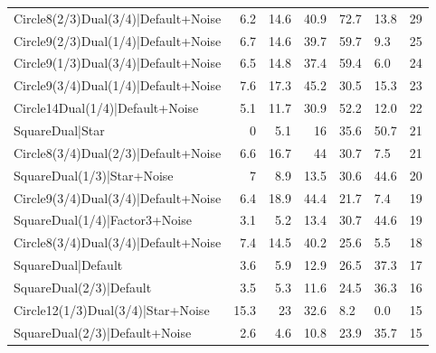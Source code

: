 \begin{tabular}{lrrrllr}
 Circle8(2/3)Dual(3/4)|Default+Noise  &             6.2 &           14.6 &            40.9 & 72.7            & 13.8            &           29 \\
 Circle9(2/3)Dual(1/4)|Default+Noise  &             6.7 &           14.6 &            39.7 & 59.7            & 9.3             &           25 \\
 Circle9(1/3)Dual(3/4)|Default+Noise  &             6.5 &           14.8 &            37.4 & 59.4            & 6.0             &           24 \\
 Circle9(3/4)Dual(1/4)|Default+Noise  &             7.6 &           17.3 &            45.2 & 30.5            & 15.3            &           23 \\
 Circle14Dual(1/4)|Default+Noise      &             5.1 &           11.7 &            30.9 & 52.2            & 12.0            &           22 \\
 SquareDual|Star                      &             0   &            5.1 &            16   & 35.6            & 50.7            &           21 \\
 Circle8(3/4)Dual(2/3)|Default+Noise  &             6.6 &           16.7 &            44   & 30.7            & 7.5             &           21 \\
 SquareDual(1/3)|Star+Noise           &             7   &            8.9 &            13.5 & 30.6            & 44.6            &           20 \\
 Circle9(3/4)Dual(3/4)|Default+Noise  &             6.4 &           18.9 &            44.4 & 21.7            & 7.4             &           19 \\
 SquareDual(1/4)|Factor3+Noise        &             3.1 &            5.2 &            13.4 & 30.7            & 44.6            &           19 \\
 Circle8(3/4)Dual(3/4)|Default+Noise  &             7.4 &           14.5 &            40.2 & 25.6            & 5.5             &           18 \\
 SquareDual|Default                   &             3.6 &            5.9 &            12.9 & 26.5            & 37.3            &           17 \\
 SquareDual(2/3)|Default              &             3.5 &            5.3 &            11.6 & 24.5            & 36.3            &           16 \\
 Circle12(1/3)Dual(3/4)|Star+Noise    &            15.3 &           23   &            32.6 & 8.2             & 0.0             &           15 \\
 SquareDual(2/3)|Default+Noise        &             2.6 &            4.6 &            10.8 & 23.9            & 35.7            &           15 \\

\end{tabular}
